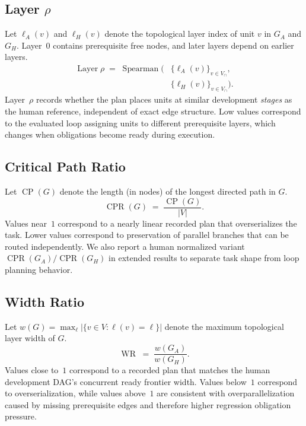 \subsection{Layer $\rho$}\label{app:layer-rho}

Let $\ell_A(v)$ and $\ell_H(v)$ denote the topological layer index of unit $v$ in $G_A$ and $G_H$. Layer~0 contains prerequisite free nodes, and later layers depend on earlier layers.
\begin{equation}
\begin{aligned}
\operatorname{Layer}\rho \;=\; \operatorname{Spearman}\!\bigl(& \{\ell_A(v)\}_{v \in V_\cap}, \\
& \{\ell_H(v)\}_{v \in V_\cap}\bigr).
\end{aligned}
\end{equation}
Layer~$\rho$ records whether the plan places units at similar development \emph{stages} as the human reference, independent of exact edge structure. Low values correspond to the evaluated loop assigning units to different prerequisite layers, which changes when obligations become ready during execution.

\subsection{Critical Path Ratio}\label{app:cp-ratio}
Let $\operatorname{CP}(G)$ denote the length (in nodes) of the longest directed path in $G$.
\begin{equation}
\operatorname{CPR}(G) \;=\; \frac{\operatorname{CP}(G)}{|V|}.
\end{equation}
Values near~$1$ correspond to a nearly linear recorded plan that overserializes the task. Lower values correspond to preservation of parallel branches that can be routed independently. We also report a human normalized variant $\operatorname{CPR}(G_A)/\operatorname{CPR}(G_H)$ in extended results to separate task shape from loop planning behavior.

\subsection{Width Ratio}\label{app:width-ratio}
Let $w(G) = \max_\ell |\{v \in V : \ell(v) = \ell\}|$ denote the maximum topological layer width of $G$.
\begin{equation}
\operatorname{WR} \;=\; \frac{w(G_A)}{w(G_H)}.
\end{equation}
Values close to~$1$ correspond to a recorded plan that matches the human development DAG's concurrent ready frontier width. Values below~$1$ correspond to overserialization, while values above~$1$ are consistent with overparallelization caused by missing prerequisite edges and therefore higher regression obligation pressure.

